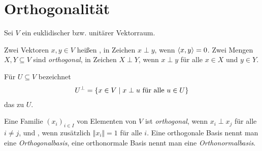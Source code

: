 \section{Orthogonalität}

Sei $V$ ein euklidischer bzw. unitärer Vektorraum.

\begin{definition}
	Zwei Vektoren $x,y\in V$ heißen , in Zeichen $x\perp y$, wenn $\left\langle x,y\right\rangle=0$. Zwei Mengen $X,Y\subseteq V$ sind \emph{orthogonal}, in Zeichen $X\perp Y$, wenn $x\perp y$ für alle $x\in X$ und $y\in Y$.
	
	Für $U\subseteq V$ bezeichnet 
	\begin{align}
		U^{\perp}=\{x\in V\mid x\perp u\text{ für alle } u\in U\}\notag
	\end{align}
	das  zu $U$.
\end{definition}

\begin{definition}[orthonormal]
	Eine Familie $(x_i)_{i\in I}$ von Elementen von $V$ ist \emph{orthogonal}, wenn $x_i\perp x_j$ für alle $i\neq j$, und , wenn zusätzlich $\Vert x_i\Vert=1$ für alle $i$. Eine orthogonale Basis nennt man eine \emph{Orthogonalbasis}, eine orthonormale Basis nennt man eine \emph{Orthonormalbasis}.
\end{definition}